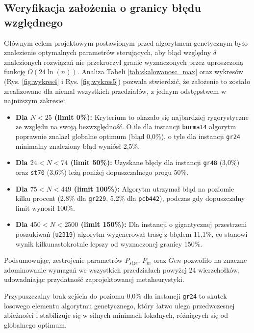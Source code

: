 \documentclass[conference]{IEEEtran}
\begin{document}
        \subsection{Weryfikacja założenia o granicy błędu względnego}
            Głównym celem projektowym postawionym przed algorytmem genetycznym było znalezienie optymalnych parametrów sterujących, aby błąd względny $\delta$ znalezionych rozwiązań nie przekroczył granic wyznaczonych przez uproszczoną funkcję $O(24\ln(n))$. Analiza Tabeli \ref{tab:skalowanosc_max} oraz wykresów (Rys. \ref{fig:wykres4} i Rys. \ref{fig:wykres5}) pozwala stwierdzić, że założenie to zostało zrealizowane dla niemal wszystkich przedziałów, z jednym odstępstwem \linebreak w najniższym zakresie:
            \begin{itemize}
                \item \textbf{Dla $N < 25$ (limit 0\%):} Kryterium to okazało się najbardziej rygorystyczne ze względu na swoją bezwzględność. O ile dla instancji \texttt{burma14} algorytm poprawnie znalazł globalne optimum (błąd 0,0\%), o tyle dla instancji \texttt{gr24} minimalny znaleziony błąd wyniósł 2,5\%.
                \item \textbf{Dla $24 < N < 74$ (limit 50\%):} Uzyskane błędy dla instancji \texttt{gr48} (3,0\%) oraz \texttt{st70} (3,6\%) leżą poniżej dopuszczalnego progu 50\%.
                \item \textbf{Dla $75 < N < 449$ (limit 100\%):} Algorytm utrzymał błąd na poziomie kilku procent (2,8\% dla \texttt{gr229}, 5,2\% dla \texttt{pcb442}), podczas gdy dopuszczalny limit wynosił 100\%.
                \item \textbf{Dla $450 < N < 2500$ (limit 150\%):} Dla instancji \linebreak o gigantycznej przestrzeni poszukiwań (\texttt{u2319}) algorytm wygenerował trasę z błędem 11,1\%, co stanowi wynik kilkunastokrotnie lepszy od wyznaczonej granicy 150\%.
            \end{itemize}
            
            Podsumowując, zestrojenie parametrów $P_{size}$, $P_m$ oraz $Gen$ pozwoliło na znaczne zdominowanie wymagań we wszystkich przedziałach powyżej 24 wierzchołków, udowadniając przydatność zaprojektowanej metaheurystyki.

            Przypuszczalny brak zejścia do poziomu 0,0\% dla instancji \texttt{gr24} to skutek losowego elementu algorytmu genetycznego, który łatwo ulega przedwczesnej zbieżności i stabilizuje się w silnych minimach lokalnych, różniących się od globalnego optimum.
\end{document}
